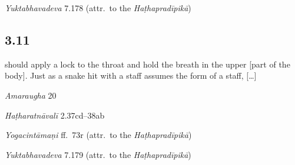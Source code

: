 \begin{ekdosis}
\begin{testimonia}[hp03_010]
\emph{Yuktabhavadeva} 7.178 (attr.~to the \emph{Haṭhapradīpikā})
\begin{versinnote}
\end{versinnote}
\end{testimonia}


\subsection*{3.11}
\begin{translation} should apply a lock to the throat and hold the breath in the upper [part of the body]. Just as a snake hit with a staff assumes the form of a staff, [\dots] 
\end{translation}

\begin{sources}[hp03_011]
\emph{Amaraugha} 20
\begin{versinnote}
\end{versinnote}
\end{sources}

\begin{testimonia}[hp03_011]
\emph{Haṭharatnāvalī} 2.37cd–38ab
\begin{versinnote}
\end{versinnote}

\emph{Yogacintāmaṇi} ff.~73r (attr.~to the \emph{Haṭhapradīpikā})
\begin{versinnote}
\end{versinnote}

\emph{Yuktabhavadeva} 7.179 (attr.~to the \emph{Haṭhapradīpikā})
\begin{versinnote}
\end{versinnote}
\end{testimonia}


\end{ekdosis}
